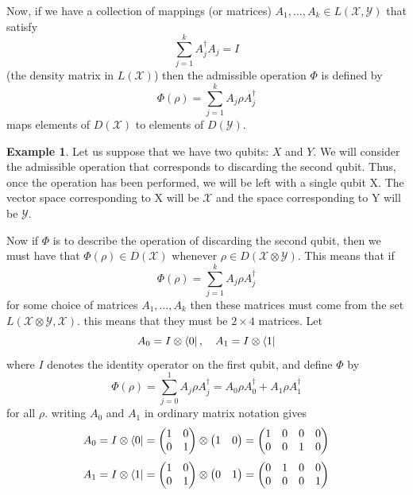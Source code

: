 \documentclass[12pt, oneside]{book}
\theoremstyle{definition}
\theoremstyle{definition}
\newtheorem{example}{Example}[section]
\theoremstyle{remark}
\begin{document}
Now, if we have a collection of mappings (or matrices) $A_1,\ldots,A_k \in L(\mathcal{X},\mathcal{Y})$ that satisfy
\[
\sum_{j=1}^k A_j^{\dagger}A_j = I
\]
(the density matrix in $L(\mathcal{X})$) then the admissible operation $\Phi$ is defined by
\[
\Phi(\rho)=\sum_{j=1}^k A_j\rho A_j^{\dagger}
\]
maps elements of $D(\mathcal{X})$ to elements of $D(\mathcal{Y})$.

\begin{example}
    Let us suppose that we have two qubits: $X$ and $Y$. We will consider the admissible operation that corresponds to discarding the second qubit. Thus, once the operation has been performed, we will be left with a single qubit X. The vector space corresponding to X will be $\mathcal{X}$ and the space corresponding to Y will be $\mathcal{Y}$.

    Now if $\Phi$ is to describe the operation of discarding the second qubit, then we must have that $\Phi(\rho)\in D(\mathcal{X})$ whenever $\rho \in D(\mathcal{X} \otimes \mathcal{Y})$. This means that if
    \[
    \Phi(\rho)=\sum_{j=1}^k A_j\rho A_j^{\dagger}
    \]
    for some choice of matrices $A_1,\ldots,A_k$ then these matrices must come from the set $L(\mathcal{X}\otimes \mathcal{Y},\mathcal{X})$. this means that they must be $2 \times 4$ matrices.
    Let
    \[
    A_0=I\otimes \bra{0},\quad A_1=I\otimes \bra{1}
    \]
    where $I$ denotes the identity operator on the first qubit, and define $\Phi$ by 
    \[
    \Phi(\rho)=\sum_{j=0}^1A_j\rho A_j^{\dagger}=A_0\rho A_0^{\dagger}+A_1 \rho A_1^{\dagger}
    \]
    for all $\rho$. writing $A_0$ and $A_1$ in ordinary matrix notation gives
    \[
    A_0=I\otimes \bra{0}=\begin{pmatrix} 1 & 0 \\ 0 & 1 \end{pmatrix} \otimes \begin{pmatrix} 1 & 0 \end{pmatrix} = \begin{pmatrix} 1 & 0& 0 & 0 \\ 0 & 0 & 1 & 0 \end{pmatrix}
    \]
    \[
    A_1=I\otimes \bra{1}=\begin{pmatrix} 1 & 0 \\ 0  & 1 \end{pmatrix} \otimes \begin{pmatrix} 0& 1 \end{pmatrix}=\begin{pmatrix} 0 & 1 & 0& 0 \\ 0 & 0 & 0 & 1 \end{pmatrix}
\]
\end{example}
\end{document}

